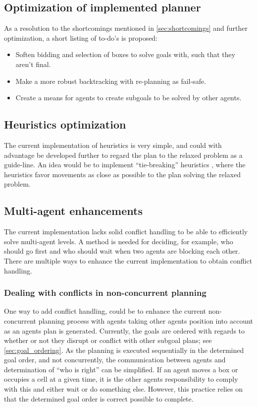 \documentclass[Main]{subfiles}
\begin{document}
\subsection{Optimization of implemented planner}
As a resolution to the shortcomings mentioned in \autoref{sec:shortcomings} and
further optimization, a short listing of to-do's is proposed:

\begin{itemize}
    \item Soften bidding and selection of boxes to solve goals with, such that they aren't final.
    \item Make a more robust backtracking with re-planning as fail-safe.
    \item Create a means for agents to create subgoals to be solved by other agents.
\end{itemize}

\subsection{Heuristics optimization}
The current implementation of heuristics is very simple, and could with
advantage be developed further to regard the plan to the relaxed problem as a
guide-line. An idea would be to implement ``tie-breaking'' heuristics
\citep{stanford2015}, where the heuristics favor movements as close as possible
to the plan solving the relaxed problem. 

\subsection{Multi-agent enhancements}
The current implementation lacks solid conflict handling to be able to
efficiently solve multi-agent levels. A method is needed for deciding, for
example, who should go first and who should wait when two agents are blocking
each other. There are multiple ways to enhance the current implementation to
obtain conflict handling.

\subsubsection{Dealing with conflicts in non-concurrent planning}
One way to add conflict handling, could be to enhance the current non-concurrent
planning process with agents taking other agents position into account as an
agents plan is generated. Currently, the goals are ordered with regards to
whether or not they disrupt or conflict with other subgoal plans; see
\autoref{sec:goal_ordering}. As the planning is executed sequentially in the
determined goal order, and not concurrently, the communication between agents
and determination of ``who is right'' can be simplified. If an agent moves a box
or occupies a cell at a given time, it is the other agents responsibility to
comply with this and either wait or do something else. However, this practice
relies on that the determined goal order is correct possible to complete.
\end{document}
